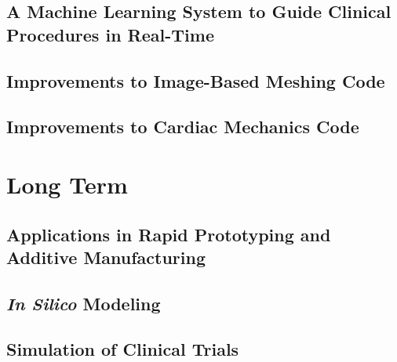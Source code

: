 \subsection[A Machine Learning System to Guide Clinical Procedures in \newline Real-Time]{\texorpdfstring{A Machine Learning System to Guide Clinical \newline Procedures in Real-Time}{A Machine Learning System to Guide Clinical \newline Procedures in Real-Time}}
\label{A Machine Learning System to Guide Clinical Procedures in Real-Time}

\subsection{Improvements to Image-Based Meshing Code}
\label{Improvements to Image-Based Meshing Code}

\subsection{Improvements to Cardiac Mechanics Code}
\label{Improvements to Cardiac Mechanics Code}

\section{Long Term}
\label{Long Term}

\subsection[Applications in Rapid Prototyping and Additive Manufacturing]{\texorpdfstring{Applications in Rapid Prototyping and Additive \newline Manufacturing}{Applications in Rapid Prototyping and Additive \newline Manufacturing}}
\label{Applications in Rapid Prototyping and Additive Manufacturing}

\subsection{\textit{In Silico} Modeling}
\label{In Silico Modeling}

\subsection{Simulation of Clinical Trials}
\label{Simulation of Clinical Trials}

